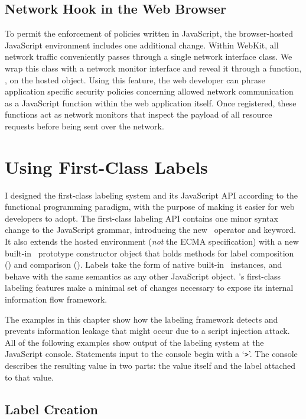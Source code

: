 \subsection{Network Hook in the Web Browser}

To permit the enforcement of policies written in JavaScript, the browser-hosted JavaScript environment includes one additional change.
Within WebKit, all network traffic conveniently passes through a single network interface class.
We wrap this class with a network monitor interface and reveal it through a function, , on the hosted  object.
Using this feature, the web developer can phrase application specific security policies concerning allowed network communication as a JavaScript function within the web application itself.
Once registered, these functions act as network monitors that inspect the payload of all resource requests before being sent over the network.

\section{Using First-Class Labels}
\label{sec:using-first-class-labels}

I designed the first-class labeling system and its JavaScript API according to the functional programming paradigm, with the purpose of making it easier for web developers to adopt.
The first-class labeling API contains one minor syntax change to the JavaScript grammar, introducing the new \mlabelof\ operator and keyword.
It also extends the hosted environment (\emph{not} the ECMA specification) with a new built-in \FlowLabel\ prototype constructor object that holds methods for label composition (\mjoin) and comparison (\msubsumes).
Labels take the form of native built-in \FlowLabelObject\ instances, and behave with the same semantics as any other JavaScript object.
\FlowCore's first-class labeling features make a minimal set of changes necessary to expose its internal information flow framework.

The examples in this chapter show how the labeling framework detects and prevents information leakage that might occur due to a script injection attack.
All of the following examples show output of the labeling system at the JavaScript console.
Statements input to the console begin with a `\verb|>|'.
The console describes the resulting value in two parts: the value itself and the label attached to that value.

\subsection{Label Creation}


